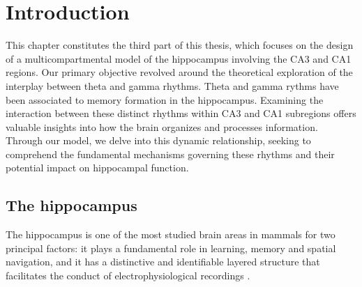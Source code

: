 \documentclass[../main.tex]{subfiles}
\begin{document}
\section{Introduction}
This chapter constitutes the third part of this thesis, which focuses on the design of a multicompartmental model of the hippocampus involving the CA3 and CA1 regions.
Our primary objective revolved around the theoretical exploration of the interplay between theta and gamma rhythms.
Theta and gamma rythms have been associated to memory formation in the hippocampus.
Examining the interaction between these distinct rhythms within CA3 and CA1 subregions offers valuable insights into how the brain organizes and processes information.
Through our model, we delve into this dynamic relationship, seeking to comprehend the fundamental mechanisms governing these rhythms and their potential impact on hippocampal function.
\subsection{The hippocampus}
The hippocampus is one of the most studied brain areas in mammals for two principal factors: it plays a fundamental role in learning, memory and spatial navigation, and it has a distinctive and identifiable layered structure that facilitates the conduct of electrophysiological recordings \citep{squire_medial_1991,witter_spatial_2006,buzsaki_memory_2013,eichenbaum_role_2017}.
\end{document}

